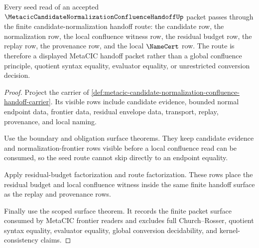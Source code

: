 \begin{theorem}
\label{thm:metacic-candidate-normalization-confluence-handoff-seed-route}
Every seed read of an accepted $\MetacicCandidateNormalizationConfluenceHandoffUp$ packet passes through the finite candidate-normalization handoff route: the candidate row, the normalization row, the local confluence witness row, the residual budget row, the replay row, the provenance row, and the local $\NameCert$ row. The route is therefore a displayed MetaCIC handoff packet rather than a global confluence principle, quotient syntax equality, evaluator equality, or unrestricted conversion decision.
\end{theorem}
\begin{proof}
Project the carrier of \autoref{def:metacic-candidate-normalization-confluence-handoff-carrier}. Its visible rows include candidate evidence, bounded normal endpoint data, frontier data, residual envelope data, transport, replay, provenance, and local naming.

Use the boundary and obligation surface theorems. They keep candidate evidence and normalization-frontier rows visible before a local confluence read can be consumed, so the seed route cannot skip directly to an endpoint equality.

Apply residual-budget factorization and route factorization. These rows place the residual budget and local confluence witness inside the same finite handoff surface as the replay and provenance rows.

Finally use the scoped surface theorem. It records the finite packet surface consumed by MetaCIC frontier readers and excludes full Church--Rosser, quotient syntax equality, evaluator equality, global conversion decidability, and kernel-consistency claims.
\end{proof}
